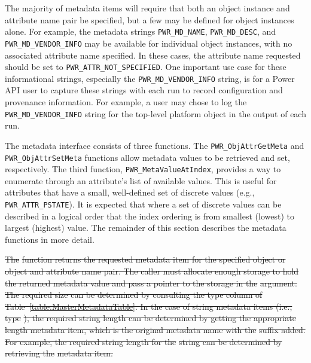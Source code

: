 \documentclass[12pt]{report} %
\providecommand{\DIFdeltex}[1]{{\protect\color{red}\sout{#1}}}                      %
\providecommand{\DIFdelbegin}{} %
\providecommand{\DIFdel}[1]{\texorpdfstring{\DIFdeltex{#1}}{}} %
\newcommand{\DIFscaledelfig}{0.5}
\newlength{\DIFdelgraphicswidth} %
\newlength{\DIFdelgraphicsheight} %
\newcommand{\DIFdelincludegraphics}[2][]{%
\sbox{\DIFdelgraphicsbox}{\DIFOincludegraphics[#1]{#2}}%
\settoboxwidth{\DIFdelgraphicswidth}{\DIFdelgraphicsbox} %
\settoboxtotalheight{\DIFdelgraphicsheight}{\DIFdelgraphicsbox} %
\scalebox{\DIFscaledelfig}{%
\parbox[b]{\DIFdelgraphicswidth}{\usebox{\DIFdelgraphicsbox}\\[-\baselineskip] \rule{\DIFdelgraphicswidth}{0em}}\llap{\resizebox{\DIFdelgraphicswidth}{\DIFdelgraphicsheight}{%
\setlength{\unitlength}{\DIFdelgraphicswidth}%
\begin{picture}(1,1)%
\thicklines\linethickness{2pt} %
{\color[rgb]{1,0,0}\put(0,0){\framebox(1,1){}}}%
{\color[rgb]{1,0,0}\put(0,0){\line( 1,1){1}}}%
{\color[rgb]{1,0,0}\put(0,1){\line(1,-1){1}}}%
\end{picture}%
}\hspace*{3pt}}} %
} %
\DeclareRobustCommand{\DIFdelbegin}{\DIFOdelbegin \let\includegraphics\DIFdelincludegraphics} %
\begin{document}
The majority
of metadata items will require that both an object instance and
attribute name pair be specified, but a few may be defined for object
instances alone.  For example, the metadata strings \texttt{PWR\_MD\_NAME},
\texttt{PWR\_MD\_DESC}, and \texttt{PWR\_MD\_VENDOR\_INFO} may be
available for individual object instances, with no associated attribute
name specified.  In these cases, the attribute name requested should
be set to \texttt{PWR_ATTR_NOT_SPECIFIED}. One important use case for
these informational strings, especially the \texttt{PWR\_MD\_VENDOR\_INFO}
string, is for a Power API user to capture these strings with each run
to record configuration and provenance information.  For example, a
user may chose to log the \texttt{PWR\_MD\_VENDOR\_INFO} string for
the top-level platform object in the output of each run.

The metadata interface consists of three functions. The
\texttt{PWR_ObjAttrGetMeta} and \texttt{PWR_ObjAttrSetMeta} functions allow
metadata values to be retrieved and set, respectively. The third function,
\texttt{PWR_MetaValueAtIndex}, provides a way to enumerate through an attribute's
list of available values.  This is useful for attributes that have a small, well-defined
set of discrete values (e.g., \texttt{PWR\_ATTR\_PSTATE}). It is expected that where 
a set of discrete values can be described in a logical order that the index ordering
is from smallest (lowest) to largest (highest) value. The remainder of
this section describes the metadata functions in more detail.

%
\DIFdelbegin %

\DIFdel{The }%
\DIFdel{function returns the requested metadata item for
the specified object or object and attribute name pair.  The caller must allocate
enough storage to hold the returned metadata value and pass a pointer to the storage
in the }%
\DIFdel{argument.  The required size can be determined by consulting
the type column of Table~\ref{table:MasterMetadataTable}.  In the case of string
metadata items (i.e., type }%
\DIFdel{), the required string length can be
determined by getting the appropriate length metadata item, which is the original
metadata name with the }%
\DIFdel{suffix added.  For example, the required
string length for the }%
\DIFdel{string can be determined by 
retrieving the }%
\DIFdel{metadata item.
}%
\end{document}
